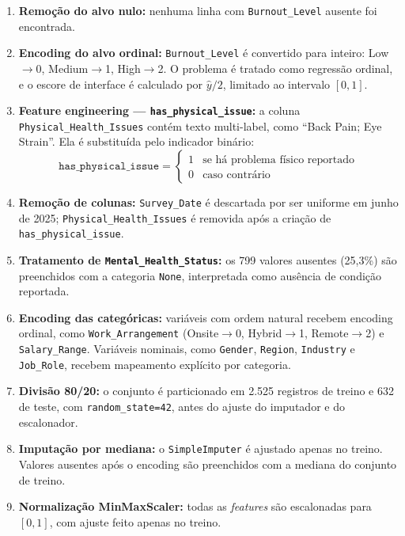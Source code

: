 \documentclass[conference]{IEEEtran}
\begin{document}
\begin{enumerate}
\item \textbf{Remoção do alvo nulo:} nenhuma linha com
\texttt{Burnout_Level} ausente foi encontrada.

\item \textbf{Encoding do alvo ordinal:} \texttt{Burnout\_Level}
      é convertido para inteiro: Low$\to$0, Medium$\to$1, High$\to$2.
      O problema é tratado como regressão ordinal, e o escore de
      interface é calculado por $\hat{y}/2$, limitado ao intervalo
      $[0,1]$.

\item \textbf{Feature engineering — \texttt{has\_physical\_issue}:}
      a coluna \texttt{Physical\_Health\_Issues} contém texto
      multi-label, como ``Back Pain; Eye Strain''. Ela é substituída
      pelo indicador binário:
      \begin{equation}
	      \texttt{has\_physical\_issue} =
	      \begin{cases}
		      1 & \text{se há problema físico reportado} \\
		      0 & \text{caso contrário}
	      \end{cases}
      \end{equation}

\item \textbf{Remoção de colunas:} \texttt{Survey\_Date} é descartada
      por ser uniforme em junho de 2025; \texttt{Physical\_Health\_Issues}
      é removida após a criação de \texttt{has\_physical\_issue}.

\item \textbf{Tratamento de \texttt{Mental\_Health\_Status}:}
      os 799 valores ausentes (25,3\%) são preenchidos com a categoria
      \texttt{None}, interpretada como ausência de condição reportada.

\item \textbf{Encoding das categóricas:} variáveis com ordem natural
      recebem encoding ordinal, como \texttt{Work\_Arrangement}
      (Onsite$\to$0, Hybrid$\to$1, Remote$\to$2) e
      \texttt{Salary\_Range}. Variáveis nominais, como \texttt{Gender},
      \texttt{Region}, \texttt{Industry} e \texttt{Job\_Role}, recebem
      mapeamento explícito por categoria.

\item \textbf{Divisão 80/20:} o conjunto é particionado em
      2.525 registros de treino e 632 de teste, com
      \texttt{random\_state=42}, antes do ajuste do imputador e do
      escalonador.

\item \textbf{Imputação por mediana:} o \texttt{SimpleImputer} é
      ajustado apenas no treino. Valores ausentes após o encoding são
      preenchidos com a mediana do conjunto de treino.

\item \textbf{Normalização MinMaxScaler:} todas as \textit{features}
      são escalonadas para $[0,1]$, com ajuste feito apenas no treino.

\end{enumerate}
\end{document}
